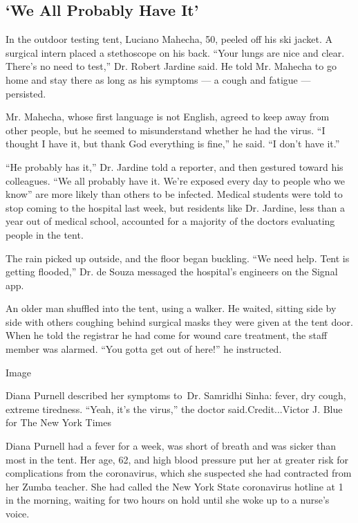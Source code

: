 \hypertarget{we-all-probably-have-it}{%
\subsection{`We All Probably Have It'}\label{we-all-probably-have-it}}

In the outdoor testing tent, Luciano Mahecha, 50, peeled off his ski
jacket. A surgical intern placed a stethoscope on his back. ``Your lungs
are nice and clear. There's no need to test,'' Dr. Robert Jardine said.
He told Mr. Mahecha to go home and stay there as long as his symptoms
--- a cough and fatigue --- persisted.

Mr. Mahecha, whose first language is not English, agreed to keep away
from other people, but he seemed to misunderstand whether he had the
virus. ``I thought I have it, but thank God everything is fine,'' he
said. ``I don't have it.''

``He probably has it,'' Dr. Jardine told a reporter, and then gestured
toward his colleagues. ``We all probably have it. We're exposed every
day to people who we know'' are more likely than others to be infected.
Medical students were told to stop coming to the hospital last week, but
residents like Dr. Jardine, less than a year out of medical school,
accounted for a majority of the doctors evaluating people in the tent.

The rain picked up outside, and the floor began buckling. ``We need
help. Tent is getting flooded,'' Dr. de Souza messaged the hospital's
engineers on the Signal app.

An older man shuffled into the tent, using a walker. He waited, sitting
side by side with others coughing behind surgical masks they were given
at the tent door. When he told the registrar he had come for wound care
treatment, the staff member was alarmed. ``You gotta get out of here!''
he instructed.

Image

Diana Purnell described her symptoms to~Dr. Samridhi Sinha: fever, dry
cough, extreme tiredness. ``Yeah, it's the virus,'' the doctor
said.Credit...Victor J. Blue for The New York Times

Diana Purnell had a fever for a week, was short of breath and was sicker
than most in the tent. Her age, 62, and high blood pressure put her at
greater risk for complications from the coronavirus, which she suspected
she had contracted from her Zumba teacher. She had called the New York
State coronavirus hotline at 1 in the morning, waiting for two hours on
hold until she woke up to a nurse's voice.

